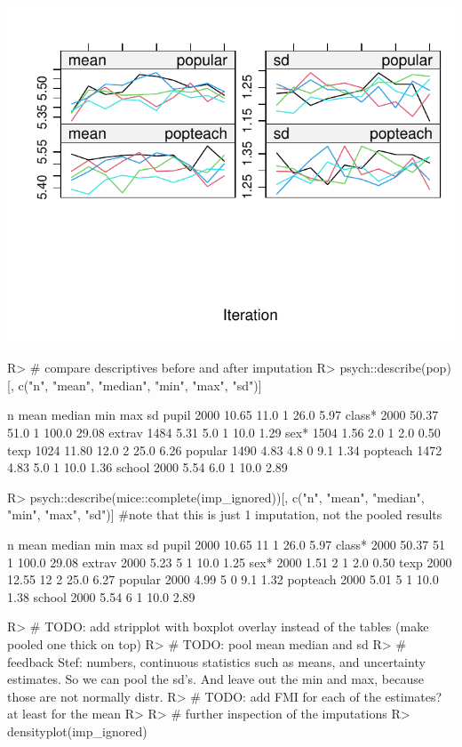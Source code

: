 \documentclass[
]{jss}
\begin{document}
\begin{CodeChunk}
\begin{center}\includegraphics{Manuscript_files/figure-latex/pop-ignored-2} \end{center}

\begin{CodeInput}
R> # compare descriptives before and after imputation
R> psych::describe(pop)[, c("n", "mean", "median", "min", "max", "sd")]
\end{CodeInput}
\begin{CodeOutput}
            n  mean median min   max    sd
pupil    2000 10.65   11.0   1  26.0  5.97
class*   2000 50.37   51.0   1 100.0 29.08
extrav   1484  5.31    5.0   1  10.0  1.29
sex*     1504  1.56    2.0   1   2.0  0.50
texp     1024 11.80   12.0   2  25.0  6.26
popular  1490  4.83    4.8   0   9.1  1.34
popteach 1472  4.83    5.0   1  10.0  1.36
school   2000  5.54    6.0   1  10.0  2.89
\end{CodeOutput}
\begin{CodeInput}
R> psych::describe(mice::complete(imp_ignored))[, c("n", "mean", "median", "min", "max", "sd")] #note that this is just 1 imputation, not the pooled results
\end{CodeInput}
\begin{CodeOutput}
            n  mean median min   max    sd
pupil    2000 10.65     11   1  26.0  5.97
class*   2000 50.37     51   1 100.0 29.08
extrav   2000  5.23      5   1  10.0  1.25
sex*     2000  1.51      2   1   2.0  0.50
texp     2000 12.55     12   2  25.0  6.27
popular  2000  4.99      5   0   9.1  1.32
popteach 2000  5.01      5   1  10.0  1.38
school   2000  5.54      6   1  10.0  2.89
\end{CodeOutput}
\begin{CodeInput}
R> # TODO: add stripplot with boxplot overlay instead of the tables (make pooled one thick on top)
R> # TODO: pool mean median and sd
R> # feedback Stef: numbers, continuous statistics such as means, and uncertainty estimates. So we can pool the sd's. And leave out the min and max, because those are not normally distr.
R> # TODO: add FMI for each of the estimates? at least for the mean
R> 
R> # further inspection of the imputations
R> densityplot(imp_ignored)
\end{CodeInput}



\end{CodeChunk}
\end{document}
